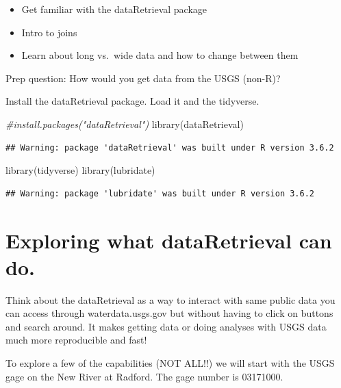 \documentclass[
]{book}
\newenvironment{Shaded}{\begin{snugshade}}{\end{snugshade}}
\newcommand{\CommentTok}[1]{\textcolor[rgb]{0.56,0.35,0.01}{\textit{#1}}}
\newcommand{\FunctionTok}[1]{\textcolor[rgb]{0.00,0.00,0.00}{#1}}
\newcommand{\NormalTok}[1]{#1}
\providecommand{\tightlist}{%
  \setlength{\itemsep}{0pt}\setlength{\parskip}{0pt}}
\begin{document}
\begin{itemize}
\tightlist
\item
  Get familiar with the dataRetrieval package
\item
  Intro to joins
\item
  Learn about long vs.~wide data and how to change between them
\end{itemize}

Prep question: How would you get data from the USGS (non-R)?

Install the dataRetrieval package. Load it and the tidyverse.

\begin{Shaded}
\begin{Highlighting}[]
\CommentTok{\#install.packages("dataRetrieval")}
\FunctionTok{library}\NormalTok{(dataRetrieval)}
\end{Highlighting}
\end{Shaded}

\begin{verbatim}
## Warning: package 'dataRetrieval' was built under R version 3.6.2
\end{verbatim}

\begin{Shaded}
\begin{Highlighting}[]
\FunctionTok{library}\NormalTok{(tidyverse)}
\FunctionTok{library}\NormalTok{(lubridate)}
\end{Highlighting}
\end{Shaded}

\begin{verbatim}
## Warning: package 'lubridate' was built under R version 3.6.2
\end{verbatim}

\hypertarget{exploring-what-dataretrieval-can-do.}{%
\section{Exploring what dataRetrieval can do.}\label{exploring-what-dataretrieval-can-do.}}

Think about the dataRetrieval as a way to interact with same public data you can access through waterdata.usgs.gov but without having to click on buttons and search around. It makes getting data or doing analyses with USGS data much more reproducible and fast!

To explore a few of the capabilities (NOT ALL!!) we will start with the USGS gage on the New River at Radford. The gage number is 03171000.
\end{document}
